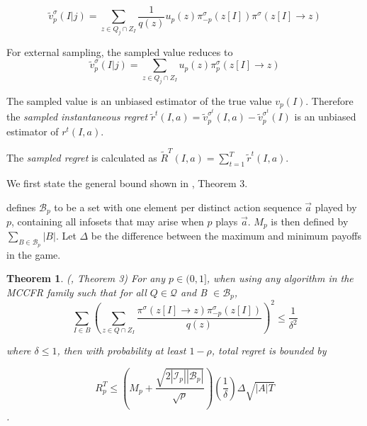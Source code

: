 \documentclass{article}
\newtheorem{theorem}{Theorem}
\begin{document}
\begin{equation}
    \tilde{v}_p^\sigma(I|j) = \sum_{z\in Q_j \cap Z_I}{
        \frac{1}{q(z)}
        u_p(z)
        \pi^\sigma_{-p}(z[I])
        \pi^\sigma(z[I] \to z)
    }
\end{equation}

For external sampling, the sampled value reduces to
\begin{equation}
        \tilde{v}^\sigma_p(I|j) = \sum_{z\in Q_j \cap Z_I}{
        u_p(z)
        \pi_p^\sigma(z[I] \to z)
    }
\end{equation}

The sampled value is an unbiased estimator of the true value $v_p(I)$. Therefore the \textit{sampled instantaneous regret} $\tilde{r}^t(I,a) = \tilde{v}_p^{\sigma^t}(I,a) - \tilde{v}_p^{\sigma^t}(I)$ is an unbiased estimator of $r^t(I,a)$.

The \textit{sampled regret} is calculated as $\tilde{R}^T(I,a)=\sum_{t=1}^T \tilde{r}^t(I,a)$.

We first state the general bound shown in \cite{lanctot2013monte}, Theorem 3.

\citealt{lanctot2013monte} defines $\mathcal{B}_p$ to be a set with one element per distinct action sequence $\vec{a}$ played by $p$, containing all infosets that may arise when $p$ plays $\vec{a}$. $M_p$ is then defined by $\sum_{B \in \mathcal{B}_p} |B|$.   Let $\Delta$ be the difference between the maximum and minimum payoffs in the game.

\begin{theorem} (\citealt{lanctot2013monte}, Theorem 3)
For any $p \in (0,1]$, when using any algorithm in the MCCFR family such that for all $Q\in \mathcal{Q}$ and B $\in \mathcal{B}_p$,
\begin{equation}
    \sum_{I\in B}\left( 
        \sum_{z \in Q \cap Z_I}{
            \frac{
                \pi^\sigma(z[I] \to z)\pi^\sigma_{-p}(z[I])
            }{
                q(z)
            }
        }
    \right)^2 \leq \frac{1}{\delta^2}
\label{thm:lanctot_general_cond}
\end{equation}

where $\delta \leq 1$, then with probability at least $1-\rho$, total regret is bounded by

\begin{equation}
    R_p^T \leq
    \left( M_p + \frac{\sqrt{2|\mathcal{I}_p||\mathcal{B}_p|}}{\sqrt{\rho}} \right)
    \left( \frac{1}{\delta} \right)
    \Delta \sqrt{|A|T}
\label{thm:lanctot_general}
\end{equation}
.
\end{theorem}
\end{document}
